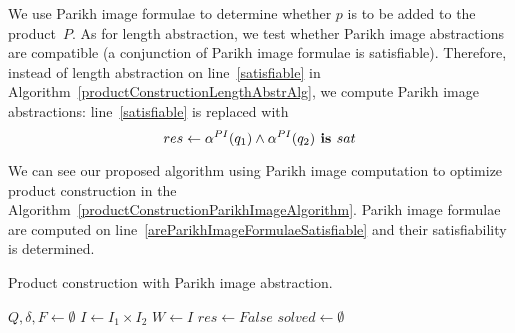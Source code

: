 We use Parikh image formulae to determine whether $p$ is to be added to the product~$P$. As for length abstraction, we test whether Parikh image abstractions are compatible (a conjunction of Parikh image formulae is satisfiable). Therefore, instead of length abstraction on line~\ref{satisfiable} in Algorithm~\ref{productConstructionLengthAbstrAlg}, we compute Parikh image abstractions: line~\ref{satisfiable}  is replaced with
\[
    res \gets \alpha^{PI}(q_1) \land \alpha^{PI}(q_2) \textbf{ is } sat
\]

We can see our proposed algorithm using Parikh image computation to optimize product construction in the Algorithm~\ref{productConstructionParikhImageAlgorithm}. Parikh image formulae are computed on line~\ref{areParikhImageFormulaeSatisfiable} and their satisfiability is determined.

\begin{algorithm}
\caption{Product construction with Parikh image abstraction.}\label{productConstructionParikhImageAlgorithm}
\DontPrintSemicolon
{}
\BlankLine
$Q, \delta, F \gets \emptyset$ \;
$I \gets I_1 \times I_2$ \;
$W \gets I$ \;
$res \gets False$ \;
$solved \gets \emptyset$ \;\label{PIAlgorithm:solved}
\end{algorithm}

